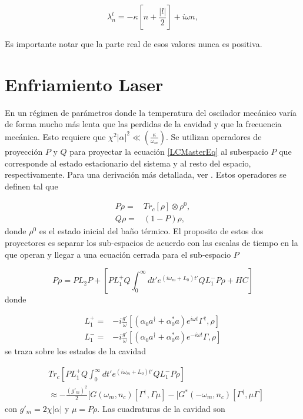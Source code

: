 \documentclass[10pt,a4paper]{report}
\begin{document}
\begin{equation}
\lambda_n^l = -\kappa[n + \frac{|l|}{2}] + i\omega n ,
\end{equation}

Es importante notar que la parte real de esos valores nunca es positiva.

\section{Enfriamiento Laser}\label{LasCool}

En un régimen de parámetros donde la temperatura del oscilador mecánico varía de forma mucho más lenta que las perdidas de la cavidad y que la frecuencia mecánica. Esto requiere que $\chi^2 |\alpha|^2 \ll (\frac{\kappa}{\omega_m})$. Se utilizan operadores de proyección $P$ y $Q$  para proyectar la ecuación  \eqref{LCMasterEq} al subespacio $P$ que corresponde al estado  estacionario del sistema y al resto del espacio, respectivamente. Para una derivación más detallada, ver \cite{NooshiLC}. Estos operadores se definen tal que

\begin{align}
P\rho=&Tr_c[\rho]\otimes \rho^{0}, \\
Q\rho=&(1-P)\rho,
\end{align} donde $\rho^0$ es el estado inicial del baño térmico. El proposito de estos dos proyectores es separar los sub-espacios de acuerdo con las escalas de tiempo en la que operan y llegar a una ecuación cerrada para el sub-espacio $P$ 


\begin{equation}
P\dot{\rho} = PL_2P + [PL^+_1Q \int_0^\infty dt' e^{(i\omega_m +L_0)t'}QL_1^- P\rho + HC]
\end{equation} donde

\begin{align}
L_1^+ =& -i\frac{g'}{\omega}[(\alpha_0 a^{\dagger}+\alpha^*_0 a)e^{i\omega t} \Gamma^{\dagger},\rho]\\
L_1^-=& -i\frac{ g'}{\omega}[(\alpha_0 a^{\dagger}+\alpha^*_0 a)e^{-i\omega t}\Gamma,\rho]
\end{align}se traza sobre los estados de la cavidad

\begin{align}
&Tr_c[PL^+_1Q \int_0^\infty dt' e^{(i\omega_m +L_0)t'}QL_1^- P\rho] \\
&\approx -\frac{(g'_m)^2}{2}[G(\omega_m,n_c)[\Gamma^\dagger,\Gamma\mu]-[G^*(-\omega_m,n_c)[\Gamma^\dagger,\mu\Gamma] \nonumber
\end{align} con $g'_m = 2\chi|\alpha|$ y $\mu = P\rho$. Las cuadraturas de la cavidad son
\end{document}
